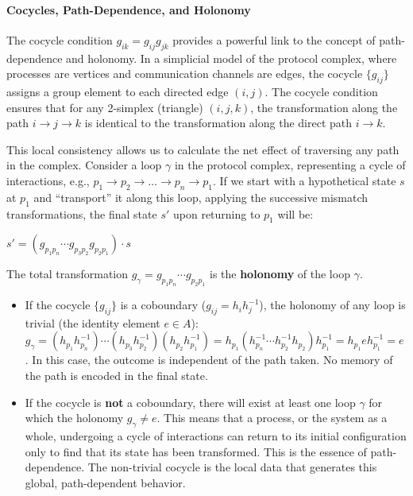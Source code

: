 \documentclass[
]{article}
\begin{document}
\paragraph{Cocycles, Path-Dependence, and
Holonomy}\label{cocycles-path-dependence-and-holonomy}

The cocycle condition \(g_{ik} = g_{ij}g_{jk}\) provides a powerful link
to the concept of path-dependence and holonomy. In a simplicial model of
the protocol complex, where processes are vertices and communication
channels are edges, the cocycle \(\{g_{ij}\}\) assigns a group element
to each directed edge \((i, j)\). The cocycle condition ensures that for
any 2-simplex (triangle) \((i, j, k)\), the transformation along the
path \(i \to j \to k\) is identical to the transformation along the
direct path \(i \to k\).

This local consistency allows us to calculate the net effect of
traversing any path in the complex. Consider a loop \(\gamma\) in the
protocol complex, representing a cycle of interactions, e.g.,
\(p_1 \to p_2 \to \dots \to p_n \to p_1\). If we start with a
hypothetical state \(s\) at \(p_1\) and ``transport'' it along this
loop, applying the successive mismatch transformations, the final state
\(s'\) upon returning to \(p_1\) will be:

\(s' = (g_{p_1 p_n} \cdots g_{p_3 p_2} g_{p_2 p_1}) \cdot s\)

The total transformation \(g_\gamma = g_{p_1 p_n} \cdots g_{p_2 p_1}\)
is the \textbf{holonomy} of the loop \(\gamma\).

\begin{itemize}
\item
  If the cocycle \(\{g_{ij}\}\) is a coboundary
  (\(g_{ij} = h_i h_j^{-1}\)), the holonomy of any loop is trivial (the
  identity element \(e \in A\)):
  \(g_\gamma = (h_{p_1} h_{p_n}^{-1}) \cdots (h_{p_3} h_{p_2}^{-1}) (h_{p_2} h_{p_1}^{-1}) = h_{p_1} (h_{p_n}^{-1} \cdots h_{p_2}^{-1}h_{p_2}) h_{p_1}^{-1} = h_{p_1} e h_{p_1}^{-1} = e\).
  In this case, the outcome is independent of the path taken. No memory
  of the path is encoded in the final state.
\item
  If the cocycle is \textbf{not} a coboundary, there will exist at least
  one loop \(\gamma\) for which the holonomy \(g_\gamma \neq e\). This
  means that a process, or the system as a whole, undergoing a cycle of
  interactions can return to its initial configuration only to find that
  its state has been transformed. This is the essence of
  path-dependence. The non-trivial cocycle is the local data that
  generates this global, path-dependent behavior.
\end{itemize}
\end{document}
